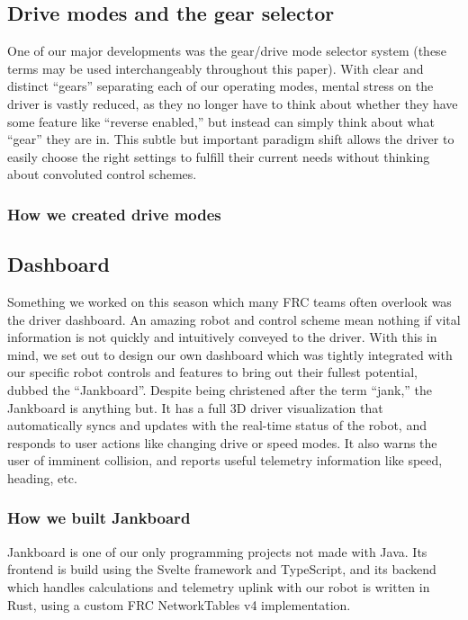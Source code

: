 \subsection{Drive modes and the gear selector}

One of our major developments was the gear/drive mode selector system
(these terms may be used interchangeably throughout this paper). With
clear and distinct ``gears'' separating each of our operating modes,
mental stress on the driver is vastly reduced, as they no longer have to
think about whether they have some feature like ``reverse enabled,'' but
instead can simply think about what ``gear'' they are in. This subtle
but important paradigm shift allows the driver to easily choose the
right settings to fulfill their current needs without thinking about
convoluted control schemes.

\subsubsection{How we created drive modes}
\blindtext{}

\subsection{Dashboard}

Something we worked on this season which many FRC teams often overlook
was the driver dashboard. An amazing robot and control scheme mean
nothing if vital information is not quickly and intuitively conveyed to
the driver. With this in mind, we set out to design our own dashboard
which was tightly integrated with our specific robot controls and
features to bring out their fullest potential, dubbed the ``Jankboard''.
Despite being christened after the term ``jank,'' the Jankboard is
anything but. It has a full 3D driver visualization that automatically
syncs and updates with the real-time status of the robot, and responds
to user actions like changing drive or speed modes. It also warns the
user of imminent collision, and reports useful telemetry information
like speed, heading, etc.

\subsubsection{How we built Jankboard}

Jankboard is one of our only programming projects not made with Java.
Its frontend is build using the Svelte framework and TypeScript, and its
backend which handles calculations and telemetry uplink with our robot
is written in Rust, using a custom FRC NetworkTables v4 implementation.




\printbibliography

